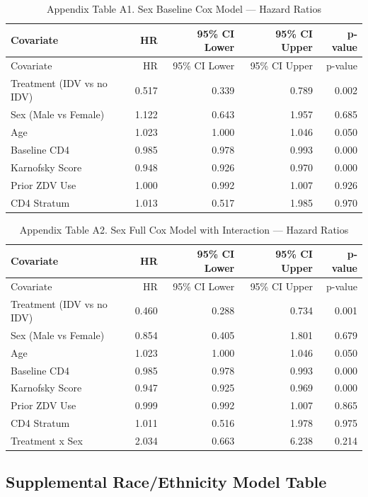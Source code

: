 \documentclass[
  letterpaper,
  DIV=11,
  numbers=noendperiod]{scrartcl}
\begin{document}
\begin{longtable}[]{@{}lrrrr@{}}
\caption{Appendix Table A1. Sex Baseline Cox Model --- Hazard
Ratios}\label{tbl-app-sex-baseline}\tabularnewline
\toprule\noalign{}
Covariate & HR & 95\% CI Lower & 95\% CI Upper & p-value \\
\midrule\noalign{}
\endfirsthead
\toprule\noalign{}
Covariate & HR & 95\% CI Lower & 95\% CI Upper & p-value \\
\midrule\noalign{}
\endhead
\bottomrule\noalign{}
\endlastfoot
Treatment (IDV vs no IDV) & 0.517 & 0.339 & 0.789 & 0.002 \\
Sex (Male vs Female) & 1.122 & 0.643 & 1.957 & 0.685 \\
Age & 1.023 & 1.000 & 1.046 & 0.050 \\
Baseline CD4 & 0.985 & 0.978 & 0.993 & 0.000 \\
Karnofsky Score & 0.948 & 0.926 & 0.970 & 0.000 \\
Prior ZDV Use & 1.000 & 0.992 & 1.007 & 0.926 \\
CD4 Stratum & 1.013 & 0.517 & 1.985 & 0.970 \\
\end{longtable}

\begin{longtable}[]{@{}lrrrr@{}}
\caption{Appendix Table A2. Sex Full Cox Model with Interaction ---
Hazard Ratios}\label{tbl-app-sex-full}\tabularnewline
\toprule\noalign{}
Covariate & HR & 95\% CI Lower & 95\% CI Upper & p-value \\
\midrule\noalign{}
\endfirsthead
\toprule\noalign{}
Covariate & HR & 95\% CI Lower & 95\% CI Upper & p-value \\
\midrule\noalign{}
\endhead
\bottomrule\noalign{}
\endlastfoot
Treatment (IDV vs no IDV) & 0.460 & 0.288 & 0.734 & 0.001 \\
Sex (Male vs Female) & 0.854 & 0.405 & 1.801 & 0.679 \\
Age & 1.023 & 1.000 & 1.046 & 0.050 \\
Baseline CD4 & 0.985 & 0.978 & 0.993 & 0.000 \\
Karnofsky Score & 0.947 & 0.925 & 0.969 & 0.000 \\
Prior ZDV Use & 0.999 & 0.992 & 1.007 & 0.865 \\
CD4 Stratum & 1.011 & 0.516 & 1.978 & 0.975 \\
Treatment x Sex & 2.034 & 0.663 & 6.238 & 0.214 \\
\end{longtable}

\subsection{Supplemental Race/Ethnicity Model
Table}\label{supplemental-raceethnicity-model-table}
\end{document}
